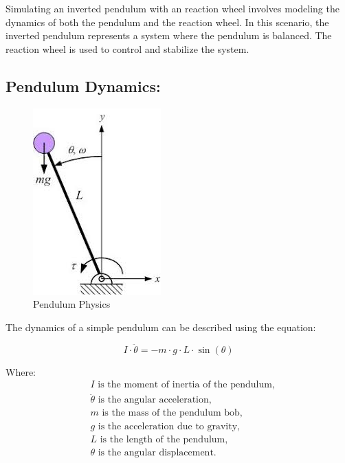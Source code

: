 \documentclass{article}
\begin{document}
\begin{multicols}{2}
Simulating an inverted pendulum with an reaction wheel involves modeling the dynamics of both the pendulum and the reaction wheel. In this scenario, the inverted pendulum represents a system where the pendulum is balanced. The reaction wheel is used to control and stabilize the system.

\subsection{Pendulum Dynamics:}

\begin{figure}[H]
\centering
\includegraphics[scale=0.5]{images}
\caption{Pendulum Physics}
\label{fig:Pendulum Physics}
\end{figure}
The dynamics of a simple pendulum can be described using the equation:

\[
I \cdot \ddot{\theta} = -m \cdot g \cdot L \cdot \sin(\theta)
\]

Where:
\begin{align*}
&I \text{ is the moment of inertia of the pendulum,} \\
&\ddot{\theta} \text{ is the angular acceleration,} \\
&m \text{ is the mass of the pendulum bob,} \\
&g \text{ is the acceleration due to gravity,} \\
&L \text{ is the length of the pendulum,} \\
&\theta \text{ is the angular displacement.}
\end{align*}

    

\end{multicols}
\end{document}
